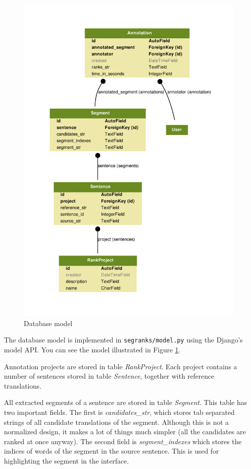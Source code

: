 \begin{figure}
    \begin{center}
        \includegraphics[width=12cm]{img/model.pdf}
    \end{center}

    \caption{Database model}
    \label{model}
\end{figure}

The database model is implemented in \texttt{segranks/model.py} using the
Django's model API. You can see the model illustrated in Figure \ref{model}.

Annotation projects are stored in table \textit{RankProject}. Each project
contains a number of sentences stored in table \textit{Sentence}, together with
reference translations. 

All extracted segments of a sentence are stored in table \textit{Segment}.
This table has two important fields. The first is \textit{candidates\_str},
which stores tab separated strings of all candidate translations of the
segment.  Although this is not a normalized design, it makes a lot of things
much simpler (all the candidates are ranked at once anyway).  The second field
is \textit{segment\_indexes} which stores the indices of words of the segment
in the source sentence.  This is used for highlighting the segment in the
interface.

